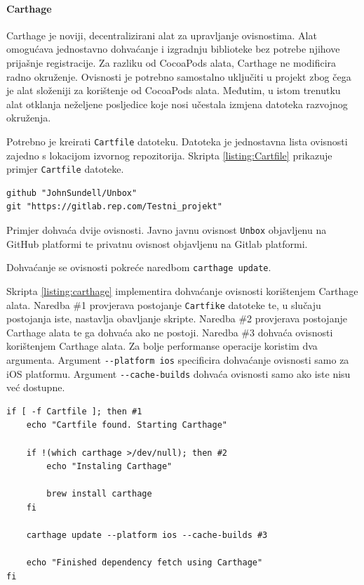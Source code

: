 \documentclass[times, utf8, diplomski, numeric]{fer}
\begin{document}
\paragraph{Carthage}

Carthage je noviji, decentralizirani alat za upravljanje ovisnostima. Alat omogućava jednostavno dohvaćanje i izgradnju biblioteke bez potrebe njihove prijašnje registracije. Za razliku od CocoaPods alata, Carthage ne modificira radno okruženje. Ovisnosti je potrebno samostalno uključiti u projekt zbog čega je alat složeniji za korištenje od CocoaPods alata. Međutim, u istom trenutku alat otklanja neželjene posljedice koje nosi učestala izmjena datoteka razvojnog okruženja.

Potrebno je kreirati \verb|Cartfile| datoteku. Datoteka je jednostavna lista ovisnosti zajedno s lokacijom izvornog repozitorija. Skripta \ref{listing:Cartfile} prikazuje primjer \verb|Cartfile| datoteke.

\begin{lstlisting}[caption=Primjer Cartfile datoteke, label=listing:Cartfile]
github "JohnSundell/Unbox"
git "https://gitlab.rep.com/Testni_projekt"
\end{lstlisting}

Primjer dohvaća dvije ovisnosti. Javno javnu ovisnost \verb|Unbox| objavljenu na GitHub platformi te privatnu ovisnost objavljenu na Gitlab platformi.

Dohvaćanje se ovisnosti pokreće naredbom \verb|carthage update|.

Skripta \ref{listing:carthage} implementira dohvaćanje ovisnosti korištenjem Carthage alata. Naredba \#1 provjerava postojanje \verb|Cartfike| datoteke te, u slučaju postojanja iste, nastavlja obavljanje skripte. Naredba \#2 provjerava postojanje Carthage alata te ga dohvaća ako ne postoji. Naredba \#3 dohvaća ovisnosti korištenjem Carthage alata. Za bolje performanse operacije koristim dva argumenta. Argument \verb|--platform ios| specificira dohvaćanje ovisnosti samo za iOS platformu. Argument \verb|--cache-builds| dohvaća ovisnosti samo ako iste nisu već dostupne.

\begin{lstlisting}[caption=Dohvat ovisnosti korištenjem alata Carthage, label=listing:carthage]
if [ -f Cartfile ]; then #1
    echo "Cartfile found. Starting Carthage"

    if !(which carthage >/dev/null); then #2
        echo "Instaling Carthage"

        brew install carthage
    fi

    carthage update --platform ios --cache-builds #3

    echo "Finished dependency fetch using Carthage"
fi
\end{lstlisting}
\end{document}
